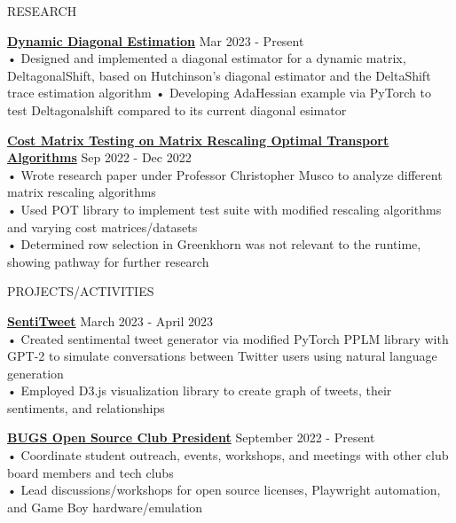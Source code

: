 \documentclass{resume} %
\begin{document}
\begin{rSection}{RESEARCH}

\textbf {\href{https://github.com/aminoa/deltagonalshift}{Dynamic Diagonal Estimation}} \hfill Mar 2023 - Present \\
• Designed and implemented a diagonal estimator for a dynamic matrix, DeltagonalShift, based on Hutchinson's diagonal estimator and the DeltaShift trace estimation algorithm \newline
• Developing AdaHessian example via PyTorch to test Deltagonalshift compared to its current diagonal esimator

\textbf {\href{https://github.com/aminoa/gaussian_pot_tests}{Cost Matrix Testing on Matrix Rescaling Optimal Transport Algorithms}} \hfill Sep 2022 - Dec 2022 \\
• Wrote research paper under Professor Christopher Musco to analyze different matrix rescaling algorithms\\ 
• Used POT library to implement test suite with modified rescaling algorithms and varying cost matrices/datasets \\
• Determined row selection in Greenkhorn was not relevant to the runtime, showing pathway for further research

\end{rSection}

\begin{rSection}{PROJECTS/ACTIVITIES}

\textbf {\href{https://github.com/aminoa/sentitweet/}{SentiTweet}} \hfill March 2023 - April 2023 \\
• Created sentimental tweet generator via modified PyTorch PPLM library with GPT-2 to simulate conversations between Twitter users using natural language generation\\
• Employed D3.js visualization library to create graph of tweets, their sentiments, and relationships 

\textbf{\href{https://bugs-nyu.github.io/}{BUGS Open Source Club President}} \hfill September 2022 - Present \\
• Coordinate student outreach, events, workshops, and meetings with other club board members and tech clubs \\
• Lead discussions/workshops for open source licenses, Playwright automation, and Game Boy hardware/emulation \\

\end{rSection}
\end{document}
